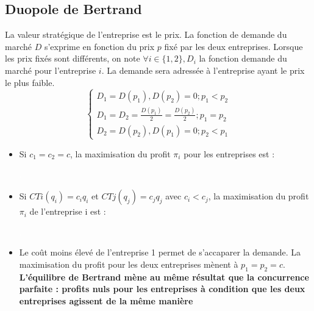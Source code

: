 \subsection{Duopole de Bertrand}
La valeur stratégique de l'entreprise est le prix. La fonction de demande du marché $D$ s'exprime en fonction du prix $p$ fixé par les deux entreprises.
Lorsque les prix fixés sont différents, on note $\forall i \in \{1,2\}, D_{i}$ la fonction demande du marché pour l'entreprise $i$. La demande sera adressée à l'entreprise ayant le prix le plus faible.
\[
\left \{
\begin{array}{c}
    D_{1} = D(p_{1}), D(p_{2}) = 0 ;p_{1} < p_{2}\\
    D_{1} = D_{2} = \frac{D(p_{1})}{2} =  \frac{D(p_{2})}{2} ;p_{1} = p_{2}\\
    D_{2} = D(p_{2}), D(p_{1}) = 0 ;p_{2} < p_{1}
\end{array}
\right.
\]
\begin{itemize}
    \item Si $c_{1} = c_{2} = c$, la maximisation du profit $\pi_{i}$ pour les entreprises est : \newline
    \textcolor{White}{.}
    \begin{center}
        \Large{}
    \end{center}
    \textcolor{White}{.}
    \item Si $CT{i}(q_{i}) = c_{i}q_{i}$ et $CT{j}(q_{j}) = c_{j}q_{j}$ avec $c_{i} < c_{j}$, la maximisation du profit $\pi_{i}$ de l'entreprise i est : \newline
    \textcolor{White}{.}
    \begin{center}
        \Large{}
    \end{center}
    \textcolor{White}{.}
    \item Le coût moins élevé de l'entreprise 1 permet de s'accaparer la demande. La maximisation du profit pour les deux entreprises mènent à $p_{1} = p_{2} = c$. \textbf{L'équilibre de Bertrand mène au même résultat que la concurrence parfaite : profits nuls pour les entreprises à condition que les deux entreprises agissent de la même manière}
\end{itemize}
\newpage
